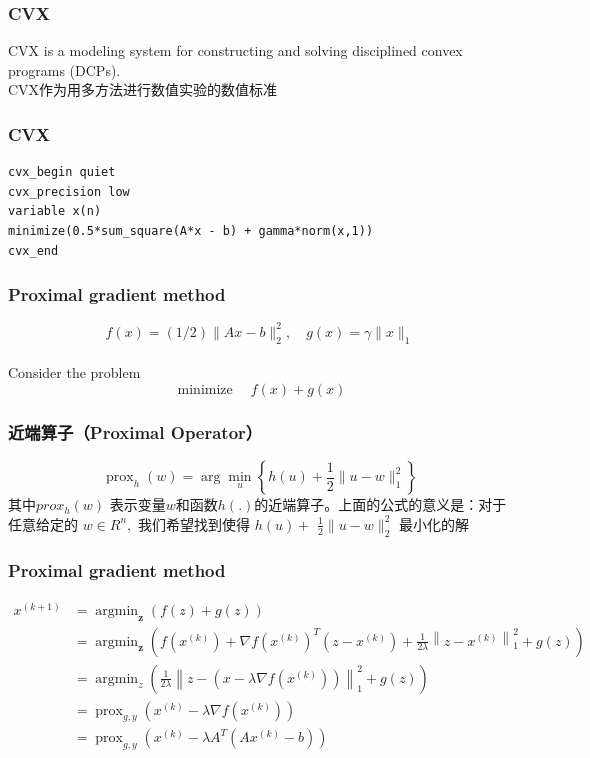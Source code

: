 \documentclass[10pt,aspectratio=43,mathserif,dvipsnames,svgnames,x11names]{beamer}
\begin{document}
	\begin{frame}
	\frametitle{CVX}
CVX is a modeling system for constructing and solving disciplined convex programs (DCPs).	
\\CVX作为用多方法进行数值实验的数值标准
	\end{frame}
	\begin{frame}[fragile]
		\frametitle{CVX}
\begin{lstlisting}
cvx_begin quiet
cvx_precision low
variable x(n)
minimize(0.5*sum_square(A*x - b) + gamma*norm(x,1))
cvx_end
\end{lstlisting}
	\end{frame}
	\begin{frame}
	\frametitle{Proximal gradient method}	
$$f(x)=(1 / 2)\|A x-b\|_{2}^{2}, \quad g(x)=\gamma\|x\|_{1}$$\\
Consider the problem
\[
\operatorname{minimize} \quad f(x)+g(x)
\]
	\end{frame}	
		\begin{frame}
\frametitle{近端算子（Proximal Operator）}
$$\operatorname{prox}_{h}(w)=\arg \min _{u}\left\{h(u)+\frac{1}{2}\|u-w\|_{1}^{2}\right\}$$
其中$prox_{h}(w)$ 表示变量$w$和函数$h(.)$的近端算子。上面的公式的意义是：对于任意给定的 $w \in R^{n},$ 我们希望找到使得 $h(u)+$ $\frac{1}{2}\|u-w\|_{2}^{2}$ 最小化的解
	\footfullcite{en1}
\end{frame}
	\begin{frame}
	\frametitle{Proximal gradient method}
	$$\begin{aligned}
	x^{(k+1)} &=\operatorname{argmin}_{\mathbf{z}}(f(z)+g(z)) \\
	&=\operatorname{argmin}_{\mathbf{z}}\left(f\left(x^{(k)}\right)+\nabla f\left(x^{(k)}\right)^{T}\left(z-x^{(k)}\right)+\frac{1}{2 \lambda}\left\|z-x^{(k)}\right\|_{1}^{2}+g(z)\right) \\
	&=\operatorname{argmin}_{z}\left(\frac{1}{2 \lambda}\left\|z-\left(x-\lambda \nabla f\left(x^{(k)}\right)\right)\right\|_{1}^{2}+g(z)\right) \\
	&=\operatorname{prox}_{g, y}\left(x^{(k)}-\lambda \nabla f\left(x^{(k)}\right)\right) \\
	&=\operatorname{prox}_{g, y}\left(x^{(k)}-\lambda A^{T}\left(A x^{(k)}-b\right)\right)
	\end{aligned}$$
\end{frame}
\end{document}
